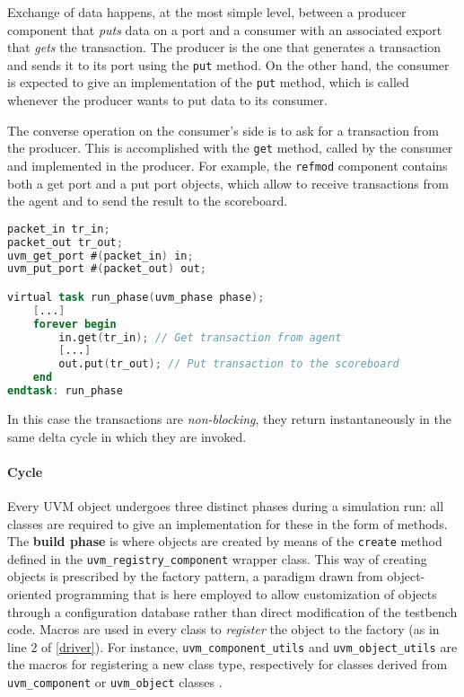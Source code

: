 Exchange of data happens, at the most simple level, between a producer component that \textit{puts} data on a port and a consumer with an associated export that \textit{gets} the transaction. The producer is the one that generates a transaction and sends it to its port using the \texttt{put} method. On the other hand, the consumer is expected to give an implementation of the \texttt{put} method, which is called whenever the producer wants to put data to its consumer.

The converse operation on the consumer's side is to ask for a transaction from the producer. This is accomplished with the \texttt{get} method, called by the consumer and implemented in the producer.
For example, the \texttt{refmod} component contains both a get port and a put port objects, which allow to receive transactions from the agent and to send the result to the scoreboard.

\begin{lstlisting}[language = verilog, caption = Snippet from \textit{refmod.sv}]
packet_in tr_in;
packet_out tr_out;
uvm_get_port #(packet_in) in;
uvm_put_port #(packet_out) out;

virtual task run_phase(uvm_phase phase);
	[...]
	forever begin
		in.get(tr_in); // Get transaction from agent
		[...]
		out.put(tr_out); // Put transaction to the scoreboard
	end
endtask: run_phase
\end{lstlisting}

In this case the transactions are \textit{non-blocking}, they return instantaneously in the same delta cycle in which they are invoked.

\paragraph{Cycle} Every UVM object undergoes three distinct phases during a simulation run: all classes are required to give an implementation for these in the form of methods.
The \textbf{build phase} is where objects are created by means of the \texttt{create} method defined in the \texttt{uvm\_registry\_component} wrapper class. This way of creating objects is prescribed by the factory pattern, a paradigm drawn from object-oriented programming that is here employed to allow customization of objects through a configuration database rather than direct modification of the testbench code. Macros are used in every class to \textit{register} the object to the factory (as in line 2 of \ref{driver}). For instance, \texttt{uvm\_component\_utils} and \texttt{uvm\_object\_utils} are the macros for registering a new class type, respectively for classes derived from \texttt{uvm\_component} or \texttt{uvm\_object} classes \cite{sistenix}.

